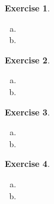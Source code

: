\documentclass{article}
\theoremstyle{definition}
\newtheorem{exercise}{Exercise}
\theoremstyle{definition}
\theoremstyle{definition}
\theoremstyle{definition}
\begin{document}
\begin{exercise}

\begin{enumerate}[(a)]

\item

\item

\end{enumerate}

\end{exercise}

\begin{exercise}

\begin{enumerate}[(a)]

\item

\item

\end{enumerate}

\end{exercise}

\begin{exercise}

\begin{enumerate}[(a)]

\item

\item

\end{enumerate}

\end{exercise}

\begin{exercise}

\begin{enumerate}[(a)]

\item

\item

\end{enumerate}

\end{exercise}
\end{document}
